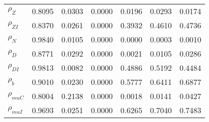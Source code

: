 \begin{center}
\begin{longtable}{lcccccc}
$ {\rho_Z}             $	 & 	          0.8095	 & 	          0.0303	 & 	          0.0000	 & 	          0.0196	 & 	          0.0293	 & 	          0.0174 \\ 
$ {\rho_{ZI}}          $	 & 	          0.8370	 & 	          0.0261	 & 	          0.0000	 & 	          0.3932	 & 	          0.4610	 & 	          0.4736 \\ 
$ {\rho_N}             $	 & 	          0.9840	 & 	          0.0105	 & 	          0.0000	 & 	          0.0000	 & 	          0.0003	 & 	          0.0010 \\ 
$ {\rho_D}             $	 & 	          0.8771	 & 	          0.0292	 & 	          0.0000	 & 	          0.0021	 & 	          0.0105	 & 	          0.0286 \\ 
$ {\rho_{DI}}          $	 & 	          0.9813	 & 	          0.0082	 & 	          0.0000	 & 	          0.4886	 & 	          0.5192	 & 	          0.4484 \\ 
$ {\rho_b}             $	 & 	          0.9010	 & 	          0.0230	 & 	          0.0000	 & 	          0.5777	 & 	          0.6411	 & 	          0.6877 \\ 
$ {\rho_{muC}}         $	 & 	          0.8004	 & 	          0.2138	 & 	          0.0000	 & 	          0.0018	 & 	          0.0141	 & 	          0.0427 \\ 
$ {\rho_{muI}}         $	 & 	          0.9693	 & 	          0.0251	 & 	          0.0000	 & 	          0.6265	 & 	          0.7040	 & 	          0.7483 \\ 
\end{longtable}
 \end{center}
